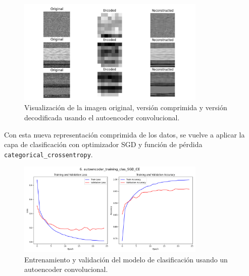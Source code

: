 \begin{figure}[h]
    \begin{center}
    \includegraphics[width=0.8\textwidth]{img/reprComprimMMC.png}
    \end{center}
    \caption{Visualización de la imagen original, versión comprimida y versión decodificada usando el autoencoder convolucional.}
    \label{img: reprComprimMMC}
\end{figure}

Con esta nueva representación comprimida de los datos, se vuelve a aplicar la capa de clasificación con optimizador SGD y función de pérdida \lstinline|categorical_crossentropy|.

\begin{figure}[H]
    \centering
    \includegraphics[width=0.8\textwidth]{img/caeMMC_sgd_ce.png}
    \caption{Entrenamiento y validación del modelo de clasificación usando un autoencoder convolucional.}
    \label{fig:resultados_cae}
\end{figure}

